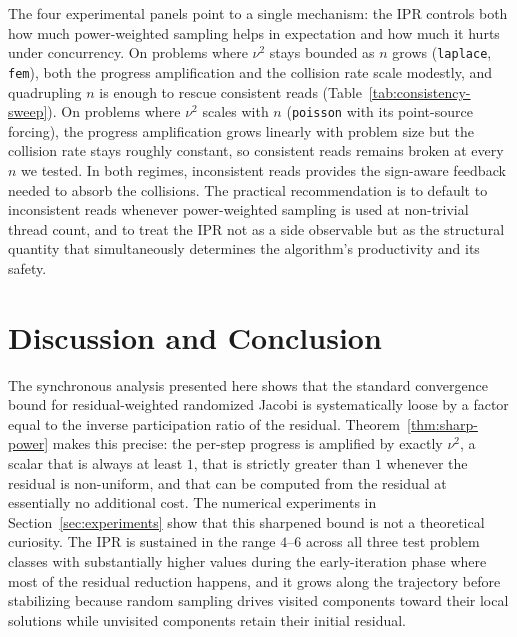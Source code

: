 \documentclass[pdflatex,sn-mathphys-num]{sn-jnl}%
\theoremstyle{thmstyleone}%
\theoremstyle{thmstyletwo}%
\theoremstyle{thmstylethree}%
\begin{document}
The four experimental panels point to a single mechanism: the IPR
controls both how much power-weighted sampling helps in expectation and
how much it hurts under concurrency. On problems where $\nu^2$ stays
bounded as $n$ grows (\texttt{laplace}, \texttt{fem}), both the progress
amplification and the collision rate scale modestly, and quadrupling $n$
is enough to rescue consistent reads (Table~\ref{tab:consistency-sweep}).
On problems where $\nu^2$ scales with $n$ (\texttt{poisson} with its
point-source forcing), the progress amplification grows linearly with
problem size but the collision rate stays roughly constant, so consistent
reads remains broken at every $n$ we tested. In both regimes,
inconsistent reads provides the sign-aware feedback needed to absorb the
collisions. The practical recommendation is to default to inconsistent
reads whenever power-weighted sampling is used at non-trivial thread
count, and to treat the IPR not as a side observable but as the
structural quantity that simultaneously determines the algorithm's
productivity and its safety.

\section{Discussion and Conclusion}
\label{sec:conclusion}

The synchronous analysis presented here shows that the standard convergence
bound for residual-weighted randomized Jacobi is systematically loose by a
factor equal to the inverse participation ratio of the residual.
Theorem~\ref{thm:sharp-power} makes this precise: the per-step progress is
amplified by exactly $\nu^2$, a scalar that is always at least $1$, that is
strictly greater than $1$ whenever the residual is non-uniform, and that
can be computed from the residual at essentially no additional cost. The
numerical experiments in Section~\ref{sec:experiments} show that this
sharpened bound is not a theoretical curiosity. The IPR is sustained in
the range $4$--$6$ across all three test problem classes with substantially
higher values during the early-iteration phase where most of the residual
reduction happens, and it grows along the trajectory before stabilizing
because random sampling drives visited components toward their local
solutions while unvisited components retain their initial residual.
\end{document}
